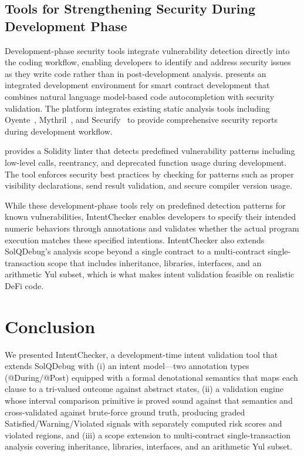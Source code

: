 \documentclass[pdflatex,sn-basic]{sn-jnl}%
\theoremstyle{thmstyleone}%
\theoremstyle{thmstyletwo}%
\theoremstyle{thmstylethree}%
\begin{document}
\subsection{Tools for Strengthening Security During Development Phase}
Development-phase security tools integrate vulnerability detection directly into the coding workflow, enabling developers to identify and address security issues as they write code rather than in post-development analysis.
\citep{making} presents an integrated development environment for smart contract development that combines natural language model-based code autocompletion with security validation.
The platform integrates existing static analysis tools including Oyente~\citep{oyente}, Mythril~\citep{mythril}, and Securify~\citep{securify} to provide comprehensive security reports during development workflow.

\citep{solhint} provides a Solidity linter that detects predefined vulnerability patterns including low-level calls, reentrancy, and deprecated function usage during development.
The tool enforces security best practices by checking for patterns such as proper visibility declarations, send result validation, and secure compiler version usage.

While these development-phase tools rely on predefined detection patterns for known vulnerabilities,
IntentChecker enables developers to specify their intended numeric behaviors through annotations and validates whether the actual program execution matches these specified intentions.
IntentChecker also extends SolQDebug's analysis scope beyond a single contract to a multi-contract single-transaction scope that includes inheritance, libraries, interfaces, and an arithmetic Yul subset, which is what makes intent validation feasible on realistic DeFi code.

\section{Conclusion}\label{sec:conclusion}

We presented IntentChecker, a development-time intent validation tool that extends SolQDebug with (i) an intent model---two annotation types (@During/@Post) equipped with a formal denotational semantics that maps each clause to a tri-valued outcome against abstract states, (ii) a validation engine whose interval comparison primitive is proved sound against that semantics and cross-validated against brute-force ground truth, producing graded Satisfied/Warning/Violated signals with separately computed risk scores and violated regions, and (iii) a scope extension to multi-contract single-transaction analysis covering inheritance, libraries, interfaces, and an arithmetic Yul subset.
\end{document}
